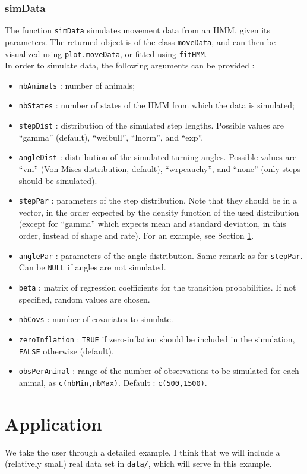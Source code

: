 \documentclass[]{article}
\begin{document}
\subsubsection{simData}
The function \texttt{simData} simulates movement data from an HMM, given its parameters. The returned object is of the class \texttt{moveData}, and can then be visualized using \texttt{plot.moveData}, or fitted using \texttt{fitHMM}.\\

In order to simulate data, the following arguments can be provided :
\begin{itemize}
	\item \texttt{nbAnimals} : number of animals;
	\item \texttt{nbStates} : number of states of the HMM from which the data is simulated;
	\item \texttt{stepDist} : distribution of the simulated step lengths. Possible values are ``gamma'' (default), ``weibull'', ``lnorm'', and ``exp''.
	\item \texttt{angleDist} : distribution of the simulated turning angles. Possible values are ``vm'' (Von Mises distribution, default), ``wrpcauchy'', and ``none'' (only steps should be simulated).
	\item \texttt{stepPar} :  parameters of the step distribution. Note that they should be in a vector, in the order expected by the density function of the used distribution (except for ``gamma'' which expects mean and standard deviation, in this order, instead of shape and rate). For an example, see Section \ref{application}.
	\item \texttt{anglePar} : parameters of the angle distribution. Same remark as for \texttt{stepPar}. Can be \texttt{NULL} if angles are not simulated.
	\item \texttt{beta} : matrix of regression coefficients for the transition probabilities. If not specified, random values are chosen.
	\item \texttt{nbCovs} : number of covariates to simulate.
	\item \texttt{zeroInflation} : \texttt{TRUE} if zero-inflation should be included in the simulation, \texttt{FALSE} otherwise (default).
	\item \texttt{obsPerAnimal} : range of the number of observations to be simulated for each animal, as \texttt{c(nbMin,nbMax)}. Default : \texttt{c(500,1500)}.
\end{itemize}

\section{Application} \label{application}
We take the user through a detailed example. I think that we will include a (relatively small) real data set in \texttt{data/}, which will serve in this example.
\end{document}
